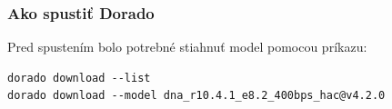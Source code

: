 \subsubsection{Ako spustiť Dorado}
Pred spustením bolo potrebné stiahnuť model pomocou príkazu:
\begin{verbatim}
dorado download --list
dorado download --model dna_r10.4.1_e8.2_400bps_hac@v4.2.0
\end{verbatim}
